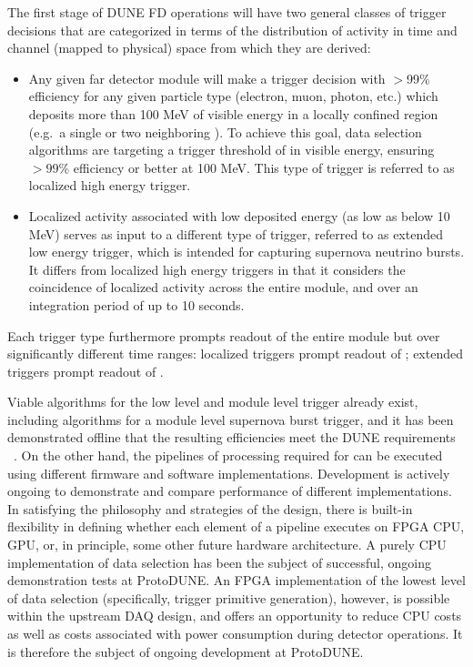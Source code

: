 The first stage of DUNE FD operations will have two general classes of trigger
decisions that are categorized in terms of the distribution of activity
in time and channel (mapped to physical) space from which they are derived: 
\begin{itemize}
\item Any given far detector module will make a trigger decision with $>$99\%
  efficiency for any given particle type (electron, muon, photon, etc.) 
  which deposits more than 100 MeV of visible energy in a locally confined
  region (e.g.~a single or two neighboring ). To achieve this goal,
  data selection algorithms are targeting a trigger threshold of  in visible energy, ensuring $>99$\%
  efficiency or better at 100 MeV. 
  This type of trigger is referred to as localized high energy trigger.
\item Localized activity associated with low deposited energy (as low as below
  10 MeV) serves as input to a different type of trigger, referred to as
  extended low energy trigger, which is intended for capturing supernova
  neutrino bursts.
  It differs from localized high energy triggers in that it considers the
  coincidence of localized activity across the entire module, and over an
  integration period of up to 10 seconds.
\end{itemize}
Each trigger type furthermore prompts readout of the entire module but over
significantly different time ranges: localized triggers prompt readout of
\dpreadout; extended triggers prompt readout of \snbtime. 

Viable algorithms for the low level and module level trigger already exist,
including algorithms for a module level supernova burst trigger, and it has been
demonstrated offline that the resulting efficiencies meet the DUNE  requirements
~\cite{xx}.
On the other hand, the pipelines of processing required for  can
be executed using different firmware and software implementations.
Development is actively ongoing to demonstrate and compare performance of
different implementations.
In satisfying the philosophy and strategies of the  design, there is
built-in flexibility in defining whether each element of a pipeline executes on
FPGA
CPU, GPU, or, in principle, some other future hardware architecture.
A purely CPU implementation of data selection has been the subject of
successful, ongoing demonstration tests at ProtoDUNE.
An FPGA implementation of the lowest level of data selection (specifically,
trigger primitive generation), however, is possible within the upstream DAQ
design, and offers an opportunity to reduce CPU costs as well as costs
associated with power consumption during detector operations.
It is therefore the subject of ongoing development at ProtoDUNE.

